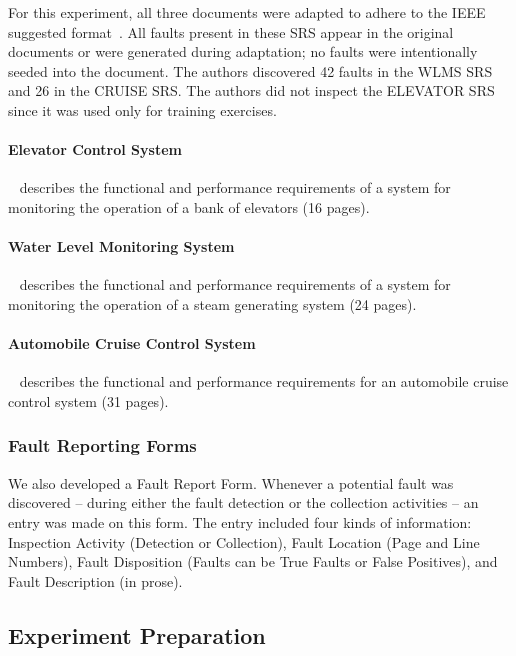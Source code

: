 For this experiment, all three documents were adapted 
to adhere to the IEEE suggested format~\cite{ieee.1989}. 
All faults present in these SRS appear in 
the original documents or were generated 
during adaptation; 
no faults were intentionally seeded into the document. 
The authors discovered 42 faults in the WLMS SRS 
and 26 in the CRUISE SRS. The authors did not 
inspect the ELEVATOR SRS since it was used only
for training exercises. 



\paragraph{Elevator Control System}~\cite{Wood:ELEV}
describes the functional and performance 
requirements of a system for monitoring the operation of
a bank of elevators (16 pages).

\paragraph{Water Level Monitoring System}~\cite{vanSchouwen:WLMS}
describes the functional and performance 
requirements of a system for monitoring the operation of
a steam generating system (24 pages).

\paragraph{Automobile Cruise Control System}~\cite{Kirby:Cruise}
describes the functional and performance requirements for 
an automobile cruise  control system (31 pages).

\subsubsection{Fault Reporting Forms}
\label{forms} 

We also developed a Fault Report Form. Whenever a 
potential fault was discovered -- during either
the fault detection or the collection activities 
--  an entry was made on this form.  The entry 
included four kinds of information:  
Inspection Activity (Detection or Collection),
Fault Location (Page and Line Numbers),
Fault Disposition (Faults can be True Faults or False Positives), 
and Fault Description (in prose).


\subsection{Experiment Preparation}
\label{preparation}


